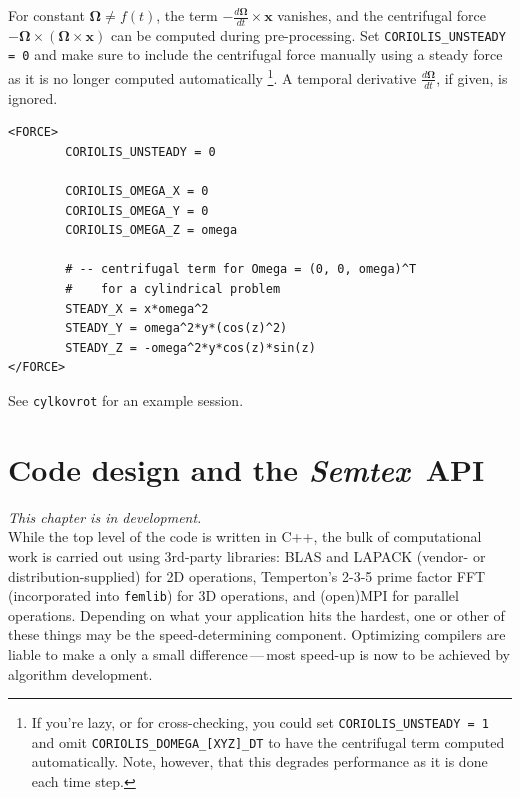 \documentclass[11pt,a4paper]{report}
\newcommand{\Semtex}{\emph{Semtex}}
\begin{document}
\noindent 
For constant $\bm{\Omega}\neq f(t)$, the term
$-\frac{d\bm{\Omega}}{dt}\times\bm{x}$ vanishes, and the centrifugal
force $-\bm{\Omega} \times (\bm{\Omega} \times \bm{x})$ can be
computed during pre-processing.
%
Set \verb|CORIOLIS_UNSTEADY = 0| and make sure to include the centrifugal
force manually using a steady force as it is no longer computed automatically%
\footnote{If you're lazy, or for cross-checking, you could set
  \texttt{CORIOLIS\_UNSTEADY = 1} and omit
  \texttt{CORIOLIS\_DOMEGA\_[XYZ]\_DT} to have the centrifugal term
  computed automatically. Note, however, that this degrades
  performance as it is done each time step.}.  A temporal derivative
$\frac{d\bm{\Omega}}{dt}$, if given, is ignored.

\begin{verbatim}
<FORCE>
        CORIOLIS_UNSTEADY = 0

        CORIOLIS_OMEGA_X = 0
        CORIOLIS_OMEGA_Y = 0
        CORIOLIS_OMEGA_Z = omega

        # -- centrifugal term for Omega = (0, 0, omega)^T
        #    for a cylindrical problem
        STEADY_X = x*omega^2
        STEADY_Y = omega^2*y*(cos(z)^2)
        STEADY_Z = -omega^2*y*cos(z)*sin(z)
</FORCE>
\end{verbatim}

\noindent See \verb|cylkovrot| for an example session.






\chapter{Code design and the \Semtex\ API}
\label{sec.api}

\textsl{This chapter is in development.}\\


While the top level of the code is written in C++, the bulk of
computational work is carried out using 3rd-party libraries: BLAS and
LAPACK (vendor- or distribution-supplied) for 2D operations,
Temperton's 2-3-5 prime factor FFT (incorporated into \texttt{femlib})
for 3D operations, and (open)MPI for parallel operations.  Depending
on what your application hits the hardest, one or other of these
things may be the speed-determining component. Optimizing compilers
are liable to make a only a small difference\,---\,most speed-up is
now to be achieved by algorithm development.
\end{document}
